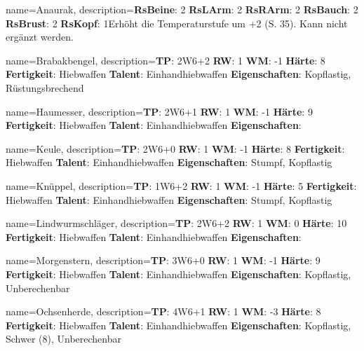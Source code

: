 {
    name={Anaurak},
    description={\textbf{RsBeine}: 2 \textbf{RsLArm}: 2 \textbf{RsRArm}: 2 \textbf{RsBauch}: 2 \textbf{RsBrust}: 2 \textbf{RsKopf}: 1\newline Erhöht die Temperaturstufe um +2 (S. 35). Kann nicht ergänzt werden.}
}



{
    name={Brabakbengel},
    description={\textbf{TP}: 2W6+2 \textbf{RW}: 1 \textbf{WM}: -1 \textbf{Härte}: 8        \textbf{Fertigkeit}: Hiebwaffen \textbf{Talent}: Einhandhiebwaffen \textbf{{Eigenschaften}}: Kopflastig, Rüstungsbrechend}
}



{
    name={Haumesser},
    description={\textbf{TP}: 2W6+1 \textbf{RW}: 1 \textbf{WM}: -1 \textbf{Härte}: 9        \textbf{Fertigkeit}: Hiebwaffen \textbf{Talent}: Einhandhiebwaffen \textbf{{Eigenschaften}}: }
}



{
    name={Keule},
    description={\textbf{TP}: 2W6+0 \textbf{RW}: 1 \textbf{WM}: -1 \textbf{Härte}: 8        \textbf{Fertigkeit}: Hiebwaffen \textbf{Talent}: Einhandhiebwaffen \textbf{{Eigenschaften}}: Stumpf, Kopflastig}
}



{
    name={Knüppel},
    description={\textbf{TP}: 1W6+2 \textbf{RW}: 1 \textbf{WM}: -1 \textbf{Härte}: 5        \textbf{Fertigkeit}: Hiebwaffen \textbf{Talent}: Einhandhiebwaffen \textbf{{Eigenschaften}}: Stumpf, Kopflastig}
}



{
    name={Lindwurmschläger},
    description={\textbf{TP}: 2W6+2 \textbf{RW}: 1 \textbf{WM}: 0 \textbf{Härte}: 10        \textbf{Fertigkeit}: Hiebwaffen \textbf{Talent}: Einhandhiebwaffen \textbf{{Eigenschaften}}: }
}



{
    name={Morgenstern},
    description={\textbf{TP}: 3W6+0 \textbf{RW}: 1 \textbf{WM}: -1 \textbf{Härte}: 9        \textbf{Fertigkeit}: Hiebwaffen \textbf{Talent}: Einhandhiebwaffen \textbf{{Eigenschaften}}: Kopflastig, Unberechenbar}
}



{
    name={Ochsenherde},
    description={\textbf{TP}: 4W6+1 \textbf{RW}: 1 \textbf{WM}: -3 \textbf{Härte}: 8        \textbf{Fertigkeit}: Hiebwaffen \textbf{Talent}: Einhandhiebwaffen \textbf{{Eigenschaften}}: Kopflastig, Schwer (8), Unberechenbar}
}



